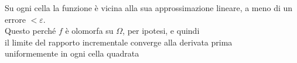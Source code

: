 \documentclass[preview]{standalone}
\begin{document}
\begin{center}
Su ogni cella la funzione è vicina alla sua approssimazione lineare, a meno di un errore $< \varepsilon$. \\Questo perché $f$ è olomorfa su $\Omega$, per ipotesi, e quindi \\il limite del rapporto incrementale converge alla derivata prima \\uniformemente in ogni cella quadrata
\end{center}
\end{document}
